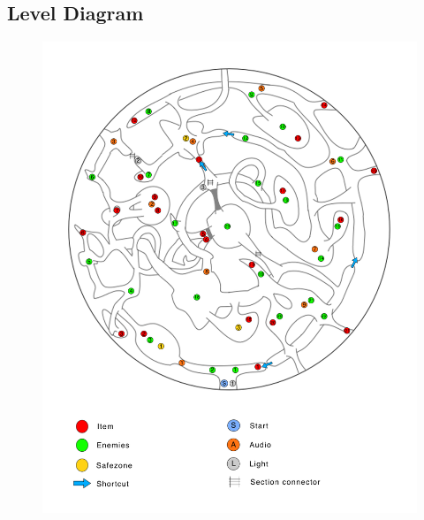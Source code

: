 \subsection{Level Diagram}
\begin{figure}[H]
	\centering
	\includegraphics[width=0.95\linewidth]{images/map/map_legend.png}
\end{figure}
\newpage

